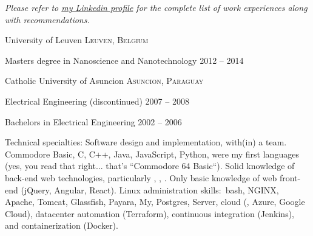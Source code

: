 \documentclass[10pt,a4paper]{article} %
\begin{document}
\begin{center}
\textit{Please refer to \href{http://www.linkedin.com/in/lugaramirez}{my Linkedin profile} for the complete list of work experiences along with recommendations.}
\end{center}


\spacedhrule{-0.2em}{-0.4em} %



\headedsection %
{University of Leuven}
{\textsc{Leuven, Belgium}} {

\headedsubsection %
{Masters degree in Nanoscience and Nanotechnology}
{2012 -- 2014}
{}
}


\headedsection %
{Catholic University of Asuncion}
{\textsc{Asuncion, Paraguay}} {

\headedsubsection %
{Electrical Engineering \textnormal{(discontinued)}}
{2007 -- 2008} {}

\headedsubsection %
{Bachelors in Electrical Engineering}
{2002 -- 2006} {}
}

\spacedhrule{0.5em}{-0.4em} %



\inlineheadsection %
{Technical specialties:}
{Software design and implementation, with(in) a team. Commodore Basic, C, C++, Java, JavaScript, Python, were my first languages (yes, you read that right... that's ``Commodore 64 Basic``). Solid knowledge of back-end web technologies, particularly , , . Only basic knowledge of web front-end (jQuery, Angular, React). Linux administration skills:\ bash, NGINX, Apache, Tomcat, Glassfish, Payara, My, Postgres, Server, cloud (, Azure, Google Cloud), datacenter automation (Terraform), continuous integration (Jenkins), and containerization (Docker).}
\end{document}
